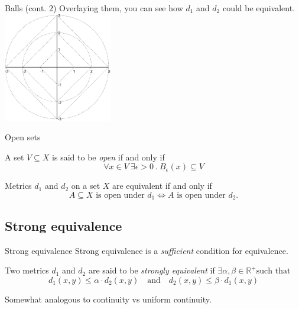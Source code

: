 \documentclass{beamer}
\begin{document}
    \begin{frame}{Balls (cont. 2)}
        Overlaying them, you can see how $d_1$ and $d_2$ could be equivalent.\\
        \centering
        \includegraphics[height=180]{nest.pdf}\\
    \end{frame}

    \begin{frame}{Open sets}
        \begin{definition}{}
            A set $V \subseteq X$ is said to be \emph{open} if and only if
            $$\forall x \in V \ \exists \epsilon > 0 \ . \ B_\epsilon(x) \subseteq V$$
        \end{definition}
        \pause
        \begin{theorem}{}
            Metrics $d_1$ and $d_2$ on a set $X$ are equivalent if and only if
            $$A \subseteq X \text{ is open under } d_1 \iff A \text{ is open under } d_2.$$
        \end{theorem}

    \end{frame}

    \subsection{Strong equivalence}
    \begin{frame}{Strong equivalence}
        Strong equivalence is a \emph{sufficient} condition for equivalence.
        \begin{definition}{}
            Two metrics $d_1$ and $d_2$ are said to be \emph{strongly equivalent} if
            $\exists \alpha, \beta \in \mathbb{R^+} \text{such that}$
            $$d_1(x,y) \le \alpha\cdot d_2(x,y) \quad \text{and} \quad d_2(x,y) \le \beta\cdot d_1(x,y)$$
        \end{definition}
    \item Somewhat analogous to continuity vs uniform continuity.
    \end{frame}
\end{document}
